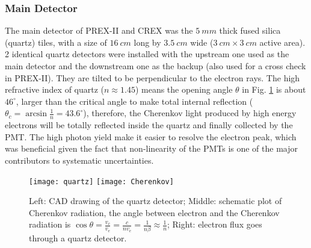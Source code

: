 \subsubsection{Main Detector}
The main detector of PREX-II and CREX was the $5\ mm$ thick fused silica (quartz) tiles,
with a size of $16\ cm$ long by $3.5\ cm$ wide ($3\ cm \times 3\ cm$ active area). 
2 identical quartz detectors were installed with the upstream one used as the 
main detector and the downstream one as the backup (also used for a cross check 
in PREX-II). They are tilted to be perpendicular to the electron rays.
The high refractive index of quartz ($n\approx 1.45$) means the opening angle $\theta$
in Fig. \ref{fig:quartz} is about $46^\circ$, larger than the critical angle
to make total internal reflection ($\theta_c = \arcsin\frac{1}{n} = 43.6^\circ$),
therefore, the Cherenkov light produced by high energy electrons will be totally
reflected inside the quartz and finally collected by the PMT. The high photon
yield make it easier to resolve the electron peak, which was beneficial given
the fact that non-linearity of the PMTs is one of the major contributors to 
systematic uncertainties.
\begin{figure}
    \texttt{[image: quartz]}
    \texttt{[image: Cherenkov]}
    \caption{Left: CAD drawing of the quartz detector; 
    Middle: schematic plot of Cherenkov radiation, the angle between 
    electron and the Cherenkov radiation is 
    $\cos\theta = \frac{v_c}{v_e} = \frac{c}{nv_e} = \frac{1}{n\beta} \approx \frac{1}{n}$;
    Right: electron flux goes through a quartz detector.
    }
    \label{fig:quartz}
\end{figure}

